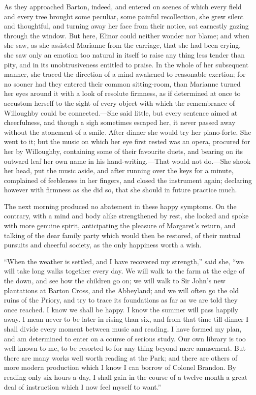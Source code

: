 As they approached Barton, indeed, and entered
on scenes of which every field and every tree brought
some peculiar, some painful recollection, she grew silent
and thoughtful, and turning away her face from their notice,
sat earnestly gazing through the window.  But here,
Elinor could neither wonder nor blame; and when she saw,
as she assisted Marianne from the carriage, that she
had been crying, she saw only an emotion too natural
in itself to raise any thing less tender than pity,
and in its unobtrusiveness entitled to praise.  In the
whole of her subsequent manner, she traced the direction
of a mind awakened to reasonable exertion; for no sooner
had they entered their common sitting-room, than Marianne
turned her eyes around it with a look of resolute firmness,
as if determined at once to accustom herself to the sight
of every object with which the remembrance of Willoughby could
be connected.---She said little, but every sentence aimed
at cheerfulness, and though a sigh sometimes escaped her,
it never passed away without the atonement of a smile.
After dinner she would try her piano-forte. She went to it;
but the music on which her eye first rested was an opera,
procured for her by Willoughby, containing some of their
favourite duets, and bearing on its outward leaf her own name
in his hand-writing.---That would not do.---She shook her head,
put the music aside, and after running over the keys
for a minute, complained of feebleness in her fingers,
and closed the instrument again; declaring however with firmness
as she did so, that she should in future practice much.

The next morning produced no abatement in these
happy symptoms.  On the contrary, with a mind and body
alike strengthened by rest, she looked and spoke with
more genuine spirit, anticipating the pleasure of
Margaret's return, and talking of the dear family party
which would then be restored, of their mutual pursuits
and cheerful society, as the only happiness worth a wish.

``When the weather is settled, and I have recovered
my strength,'' said she, ``we will take long walks together
every day.  We will walk to the farm at the edge of the down,
and see how the children go on; we will walk to Sir John's
new plantations at Barton Cross, and the Abbeyland;
and we will often go the old ruins of the Priory,
and try to trace its foundations as far as we are told
they once reached.  I know we shall be happy.  I know
the summer will pass happily away.  I mean never to be
later in rising than six, and from that time till dinner
I shall divide every moment between music and reading.
I have formed my plan, and am determined to enter on a course
of serious study.  Our own library is too well known to me,
to be resorted to for any thing beyond mere amusement.
But there are many works well worth reading at the Park;
and there are others of more modern production which I
know I can borrow of Colonel Brandon.  By reading only six
hours a-day, I shall gain in the course of a twelve-month
a great deal of instruction which I now feel myself to want.''

